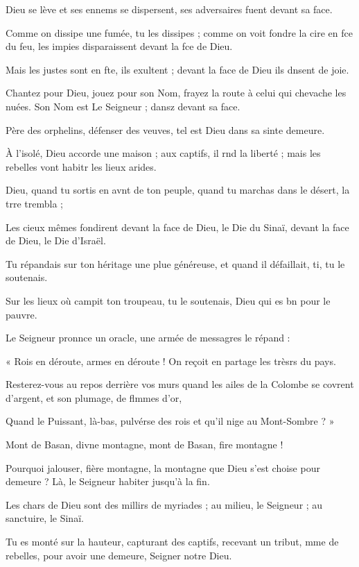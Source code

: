 \item Dieu se lève et ses ennems se dispersent, ses adversaires fuent devant sa face.
\item Comme on dissipe une fumée, tu les dissipes ; comme on voit fondre la cire en fce du feu, les impies disparaissent devant la fce de Dieu.
\item Mais les justes sont en fte, ils exultent ; devant la face de Dieu ils dnsent de joie.
\item Chantez pour Dieu, jouez pour son Nom, frayez la route à celui qui chevache les nuées. Son Nom est Le Seigneur ; dansz devant sa face.
\item Père des orphelins, défenser des veuves, tel est Dieu dans sa sinte demeure.
\item À l’isolé, Dieu accorde une maison ; aux captifs, il rnd la liberté ; mais les rebelles vont habitr les lieux arides.
\item Dieu, quand tu sortis en avnt de ton peuple, quand tu marchas dans le désert, la trre trembla ;
\item Les cieux mêmes fondirent devant la face de Dieu, le Die du Sinaï, devant la face de Dieu, le Die d’Israël.
\item Tu répandais sur ton héritage une plue généreuse, et quand il défaillait, ti, tu le soutenais.
\item Sur les lieux où campit ton troupeau, tu le soutenais, Dieu qui es bn pour le pauvre.
\item Le Seigneur pronnce un oracle, une armée de messagres le répand :
\item « Rois en déroute, armes en déroute ! On reçoit en partage les trèsrs du pays.
\item Resterez-vous au repos derrière vos murs quand les ailes de la Colombe se covrent d’argent, et son plumage, de flmmes d’or,
\item Quand le Puissant, là-bas, pulvérse des rois et qu’il nige au Mont-Sombre ? »
\item Mont de Basan, divne montagne, mont de Basan, fire montagne !
\item Pourquoi jalouser, fière montagne, la montagne que Dieu s’est choise pour demeure ? Là, le Seigneur habiter jusqu’à la fin.
\item Les chars de Dieu sont des millirs de myriades ; au milieu, le Seigneur ; au sanctuire, le Sinaï.
\item Tu es monté sur la hauteur, capturant des captifs, recevant un tribut, mme de rebelles, pour avoir une demeure, Seigner notre Dieu.
